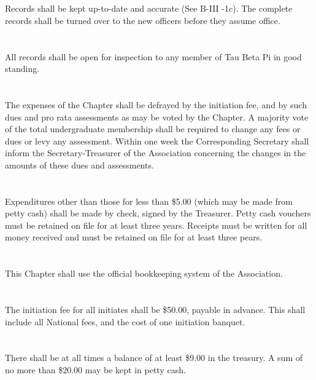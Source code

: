 \documentclass[12pt]{constitution}
\begin{document}
\section{}
Records shall be kept up-to-date and accurate (See B-III -1c). The complete records shall be turned over to the new officers before they assume office.
\section{}
All records shall be open for inspection to any member of Tau Beta Pi in good standing.

\section{}
The expenses of the Chapter shall be defrayed by the initiation fee, and by such dues and pro rata assessments as may be voted by the Chapter. A majority vote of the total undergraduate membership shall be required to change any fees or dues or levy any assessment. Within one week the Corresponding Secretary shall inform the Secretary-Treasurer of the Association concerning the changes in the amounts of these dues and assessments.
\section{}
Expenditures other than those for less than \$5.00 (which may be made from petty cash) shall be made by check, signed by the Treasurer. Petty cash vouchers must be retained on file for at least three years. Receipts must be written for all money received and must be retained on file for at least three pears.
\section{}
This Chapter shall use the official bookkeeping system of the Association. 
\section{} %
The initiation fee for all initiates shall be \$50.00, payable in advance. This shall include all National fees, and the cost of one initiation banquet.
\section{}
There shall be at all times a balance of at least \$9.00 in the treasury. A sum of no more than \$20.00 may be kept in petty cash.
\end{document}
